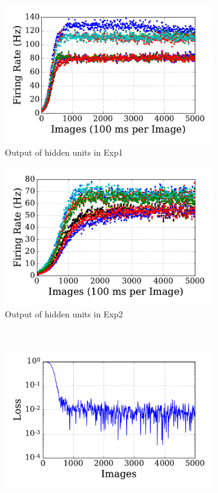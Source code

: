 \begin{figure}
\begin{subfigure}[t]{0.45\textwidth}
		\includegraphics[width=\textwidth]{pics_sdlm/00_exp_SAE_Orig/exp1_hid_s.pdf}
		\caption{Output of hidden units in Exp1}
	\end{subfigure}
	\begin{subfigure}[t]{0.45\textwidth}
		\includegraphics[width=\textwidth]{pics_sdlm/00_exp_SAE_Orig/exp2_hid_s.pdf}
		\caption{Output of hidden units in Exp2}
	\end{subfigure}\\
	\begin{subfigure}[t]{0.45\textwidth}
		\includegraphics[width=\textwidth]{pics_sdlm/00_exp_SAE_Orig/exp1_mse_nons.pdf}

\end{subfigure}
\end{figure}
